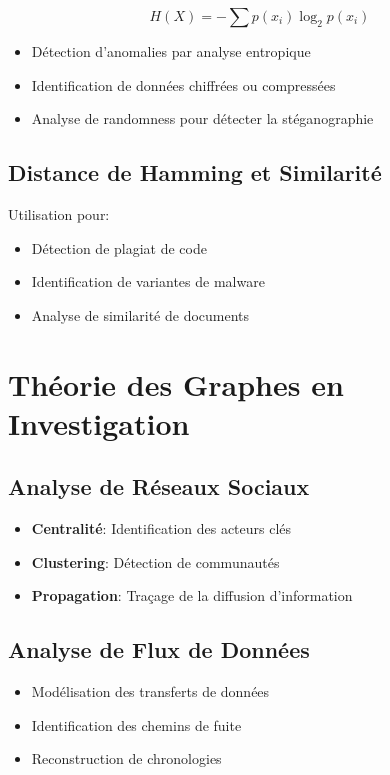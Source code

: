 \[ H(X) = -\sum p(x_i) \log_2 p(x_i) \]

\begin{itemize}
\item Détection d'anomalies par analyse entropique
\item Identification de données chiffrées ou compressées
\item Analyse de randomness pour détecter la stéganographie
\end{itemize}

\subsection{Distance de Hamming et Similarité}
Utilisation pour:

\begin{itemize}
\item Détection de plagiat de code
\item Identification de variantes de malware
\item Analyse de similarité de documents
\end{itemize}

\section{Théorie des Graphes en Investigation}
\subsection{Analyse de Réseaux Sociaux}
\begin{itemize}
\item \textbf{Centralité}: Identification des acteurs clés
\item \textbf{Clustering}: Détection de communautés
\item \textbf{Propagation}: Traçage de la diffusion d'information
\end{itemize}

\subsection{Analyse de Flux de Données}
\begin{itemize}
\item Modélisation des transferts de données
\item Identification des chemins de fuite
\item Reconstruction de chronologies
\end{itemize}
